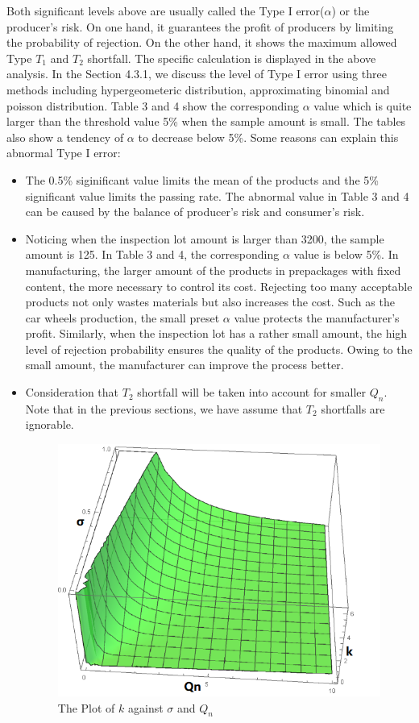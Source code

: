 \documentclass[a4paper]{article}
\begin{document}
Both significant levels above are usually called the Type I error($ \alpha $) or the producer's risk. On one hand, it guarantees the profit of producers by limiting the probability of rejection. On the other hand, it shows the maximum allowed Type $ T_{1} $ and  $ T_{2} $ shortfall. The specific calculation is displayed in the above analysis. In the Section 4.3.1, we discuss the level of Type I error using three methods including hypergeometeric distribution, approximating binomial and poisson distribution. Table 3 and 4 show the corresponding $ \alpha $ value which is quite larger than the threshold value 5\% when the sample amount is small. The tables also show a tendency of $ \alpha $ to decrease below 5\%. Some reasons can explain this abnormal Type I error:
\begin{itemize}
\item The 0.5\% siginificant value limits the mean of the products and the 5\% significant value limits the passing rate. The abnormal value in Table 3 and 4 can be caused by the balance of producer's risk and consumer's risk. 
\item Noticing when the inspection lot amount is larger than 3200, the sample amount is 125. In Table 3 and 4, the corresponding $ \alpha $ value is below 5\%. In manufacturing, the larger amount of the products in prepackages with fixed content, the more necessary to control its cost. Rejecting too many acceptable products not only wastes materials but also increases the cost. Such as the car wheels production, the small preset $ \alpha $ value protects the manufacturer's profit. Similarly, when the inspection lot has a rather small amount, the high level of rejection probability ensures the quality of the products. Owing to the small amount, the manufacturer can improve the process better. 

\item Consideration that $T_2$ shortfall will be taken into account for smaller $Q_n$. Note that in the previous sections, we have assume that $T_2$ shortfalls are ignorable.

\begin{figure}[!htbp] 
\centering 
\includegraphics[width=0.6\linewidth]{T12.png}  
\caption{The Plot of $k$ against $\sigma$ and $Q_n$} 
\label{fig1}
\end{figure}


\end{itemize}
\end{document}
